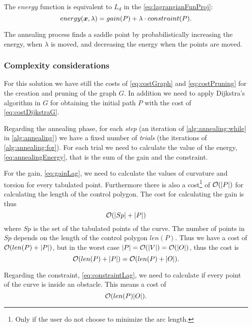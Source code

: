 \documentclass[dissertation.tex]{subfiles}
\begin{document}
The $energy$ function is equivalent to $L_d$ in the
\cref{eq:lagrangianFunProj}:
\begin{equation}
  \label{eq:annealingEnergy}
  energy(\boldsymbol{x},\lambda)=gain(P)+\lambda\cdot constraint(P).
\end{equation}

The annealing process
finds a saddle point by probabilistically increasing the energy, when
$\lambda$ is moved, and 
decreasing the energy when the points are moved.

\subsubsection{Complexity considerations}
For this solution we have still the costs of \cref{eq:costGraph} and
\cref{eq:costPruning} for
the creation and pruning of the graph $G$. In addition we need to
apply Dijkstra's
algorithm in $G$ for obtaining the initial path $P$ with the cost of
\cref{eq:costDijkstraG}.

Regarding the annealing phase, for each \emph{step} (an
iteration of \cref{alg:annealing:while} in \cref{alg:annealing}) we
have a fixed number of \emph{trials} (the iterations of \cref{alg:annealing:for}). For each trial we need to
calculate the value of the energy, \cref{eq:annealingEnergy}, that is
the sum of the gain and the constraint.

For the gain, \cref{eq:gainLag}, we need to calculate the values of
curvature and torsion for every tabulated point. Furthermore there is
also a cost\footnote{Only if
  the user do not choose to minimize the arc length.} of
$\mathcal{O}(|P|)$ for
calculating the length of the control polygon. The cost for
calculating the gain is thus
\begin{equation*}
  \mathcal{O}(|Sp|+|P|)
\end{equation*}
where $Sp$ is the set of the tabulated points of the curve. The number
of points in $Sp$ depends on the length of the control polygon
$len(P)$. Thus
we have a cost of $\mathcal{O}(len(P)+|P|)$, but in the worst case
$|P|=\mathcal{O}(|V|)=\mathcal{O}(|O|)$, thus the cost is
\newcommand{\eqCostGain}{\ensuremath{\bigO(len(P)+|P|)=\bigO(len(P)+|\obsSet|)}}
\begin{equation}
  \label{eq:costGain}
  \eqCostGain.
\end{equation}

Regarding the constraint, \cref{eq:constraintLag}, we need to calculate if
every point 
of the curve is inside an obstacle. This means a cost of
\newcommand{\eqCostConstraint}{\ensuremath{\bigO(len(P)|\obsSet|)}}
\begin{equation}
  \label{eq:costConstraint}
  \eqCostConstraint.
\end{equation}
\end{document}

